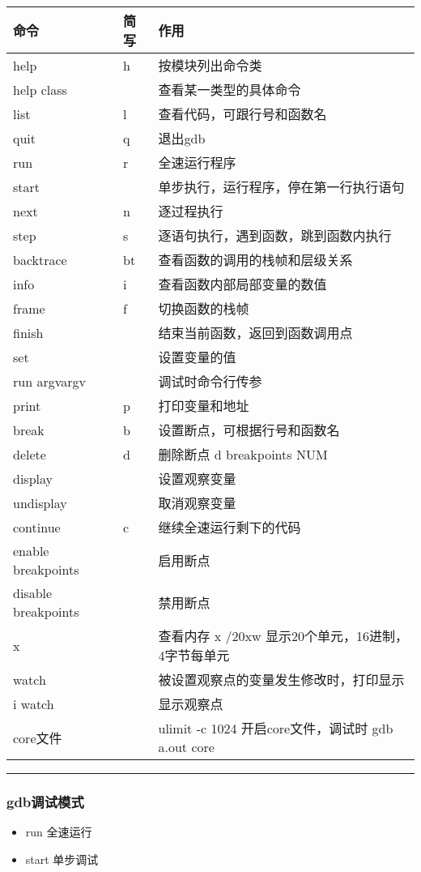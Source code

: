\documentclass[11pt]{article}
\begin{document}
\begin{center}
\begin{tabular}{lll}
命令 & 简写 & 作用\\
\hline
help & h & 按模块列出命令类\\
help class &  & 查看某一类型的具体命令\\
list & l & 查看代码，可跟行号和函数名\\
quit & q & 退出gdb\\
run & r & 全速运行程序\\
start &  & 单步执行，运行程序，停在第一行执行语句\\
next & n & 逐过程执行\\
step & s & 逐语句执行，遇到函数，跳到函数内执行\\
backtrace & bt & 查看函数的调用的栈帧和层级关系\\
info & i & 查看函数内部局部变量的数值\\
frame & f & 切换函数的栈帧\\
finish &  & 结束当前函数，返回到函数调用点\\
set &  & 设置变量的值\\
run argv\footnotemark argv\footnotemark &  & 调试时命令行传参\\
print & p & 打印变量和地址\\
break & b & 设置断点，可根据行号和函数名\\
delete & d & 删除断点 d breakpoints NUM\\
display &  & 设置观察变量\\
undisplay &  & 取消观察变量\\
continue & c & 继续全速运行剩下的代码\\
enable breakpoints &  & 启用断点\\
disable breakpoints &  & 禁用断点\\
x &  & 查看内存 x /20xw   显示20个单元，16进制，4字节每单元\\
watch &  & 被设置观察点的变量发生修改时，打印显示\\
i watch &  & 显示观察点\\
core文件 &  & ulimit -c 1024  开启core文件，调试时 gdb a.out core\\
\end{tabular}
\end{center}

\rule{\linewidth}{0.5pt}

\subsubsection{gdb调试模式}
\label{sec-1-7-1}
\begin{itemize}
\item run 全速运行
\item start 单步调试
\end{itemize}
\end{document}
